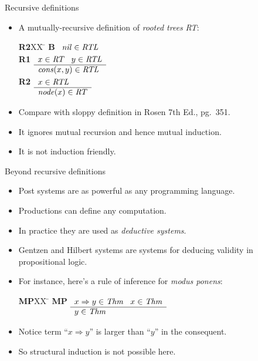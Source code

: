 \documentclass[style=sailor,size=12pt]{powerdot}
\newcommand{\id}[1]{\mbox{\it #1\/}}
\begin{document}
\begin{wideslide}[bm=,toc=]{Recursive definitions}
\begin{itemize}
\item A mutually-recursive definition of {\em rooted trees\/} {\em RT\/}:
\vspace{-1em}
\begin{tabbing}
{\bf R2}XX \=  \kill
{\bf B} \>
        \(\begin{array}[t]{l}
        \id{nil}\in\id{RTL}
        \end{array}\) \\[2ex]
{\bf R1} \>
        \(\begin{array}[t]{l}
        x\in\id{RT}\;\;\;y\in\id{RTL} \\
        \hline
        \id{cons}(x,y)\in\id{RTL}
        \end{array}\) \\[2ex]
{\bf R2} \>
        \(\begin{array}[t]{l}
        x\in\id{RTL} \\
        \hline
        \id{node}(x)\in\id{RT}
        \end{array}\)
\end{tabbing}
\item Compare with sloppy definition in Rosen 7th Ed., pg.\ 351.
\item It ignores mutual recursion and hence mutual induction.
\item It is not induction friendly.
\end{itemize}
\end{wideslide}

\begin{wideslide}[bm=,toc=]{Beyond recursive definitions}
\begin{itemize}
\item Post systems are as powerful as any programming language.
\item Productions can define any computation.
\item In practice they are used as {\em deductive systems\/}.
\item Gentzen and Hilbert systems are systems for deducing validity in propositional logic.
\item For instance, here's a rule of inference for {\em modus ponens\/}:
\vspace{-1em}
\begin{tabbing}
{\bf MP}XX \=  \kill
{\bf MP} \>
        \(\begin{array}[t]{l}
        x\Rightarrow y \in\id{Thm}\;\;\;x\in\id{Thm} \\
        \hline
        y\in\id{Thm}
        \end{array}\)
\end{tabbing}
\item Notice term ``$x\Rightarrow y$'' is larger than ``$y$'' in the consequent.
\item So structural induction is not possible here.
\end{itemize}
\end{wideslide}
\end{document}
